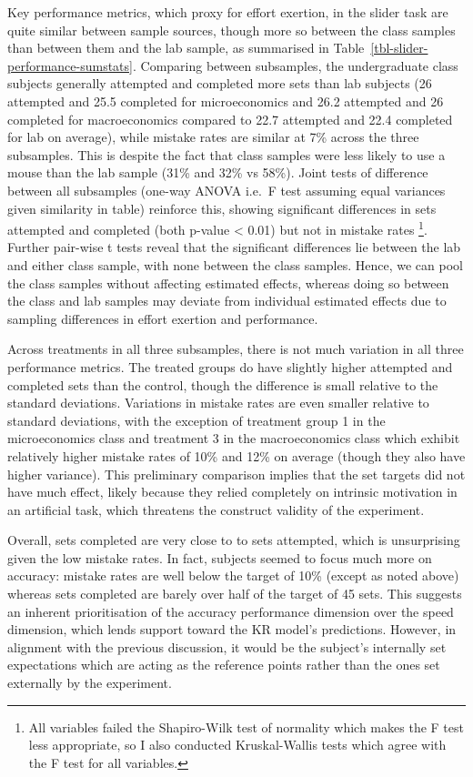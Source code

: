\documentclass[
  12,
  letterpaper,
  DIV=11,
  numbers=noendperiod]{scrartcl}
\begin{document}
Key performance metrics, which proxy for effort exertion, in the slider
task are quite similar between sample sources, though more so between
the class samples than between them and the lab sample, as summarised in
Table~\ref{tbl-slider-performance-sumstats}. Comparing between
subsamples, the undergraduate class subjects generally attempted and
completed more sets than lab subjects (26 attempted and 25.5 completed
for microeconomics and 26.2 attempted and 26 completed for
macroeconomics compared to 22.7 attempted and 22.4 completed for lab on
average), while mistake rates are similar at 7\% across the three
subsamples. This is despite the fact that class samples were less likely
to use a mouse than the lab sample (31\% and 32\% vs 58\%). Joint tests
of difference between all subsamples (one-way ANOVA i.e.~F test assuming
equal variances given similarity in table) reinforce this, showing
significant differences in sets attempted and completed (both p-value
\textless{} 0.01) but not in mistake rates \footnote{All variables
  failed the Shapiro-Wilk test of normality which makes the F test less
  appropriate, so I also conducted Kruskal-Wallis tests which agree with
  the F test for all variables.}. Further pair-wise t tests reveal that
the significant differences lie between the lab and either class sample,
with none between the class samples. Hence, we can pool the class
samples without affecting estimated effects, whereas doing so between
the class and lab samples may deviate from individual estimated effects
due to sampling differences in effort exertion and performance.

Across treatments in all three subsamples, there is not much variation
in all three performance metrics. The treated groups do have slightly
higher attempted and completed sets than the control, though the
difference is small relative to the standard deviations. Variations in
mistake rates are even smaller relative to standard deviations, with the
exception of treatment group 1 in the microeconomics class and treatment
3 in the macroeconomics class which exhibit relatively higher mistake
rates of 10\% and 12\% on average (though they also have higher
variance). This preliminary comparison implies that the set targets did
not have much effect, likely because they relied completely on intrinsic
motivation in an artificial task, which threatens the construct validity
of the experiment.

Overall, sets completed are very close to to sets attempted, which is
unsurprising given the low mistake rates. In fact, subjects seemed to
focus much more on accuracy: mistake rates are well below the target of
10\% (except as noted above) whereas sets completed are barely over half
of the target of 45 sets. This suggests an inherent prioritisation of
the accuracy performance dimension over the speed dimension, which lends
support toward the KR model's predictions. However, in alignment with
the previous discussion, it would be the subject's internally set
expectations which are acting as the reference points rather than the
ones set externally by the experiment.
\end{document}
